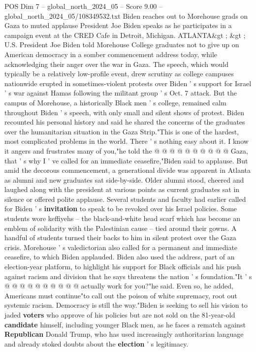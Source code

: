 \begin{textsample}{POS Dim 7 – global\_north\_2024\_05 – Score 9.00 – global\_north\_2024\_05/108349532.txt}  \label{ex:f7_pos_056}
Biden reaches out to Morehouse grads on Gaza to muted applause President Joe Biden speaks as he participates in a campaign event at the CRED Cafe in Detroit, Michigan.
ATLANTA\&gt ; \&gt ; U.S.
President Joe Biden told Morehouse College graduates not to give up on American democracy in a somber commencement address today, while acknowledging their anger over the war in Gaza.
The speech, which would typically be a relatively low-profile event, drew scrutiny as college campuses nationwide erupted in sometimes-violent protests over Biden ' s support for Israel ' s war against Hamas following the militant group ' s Oct. 7 attack.
But the campus of Morehouse, a historically Black men ' s college, remained calm throughout Biden ' s speech, with only small and silent shows of protest.
Biden recounted his personal history and said he shared the concerns of the graduates over the humanitarian situation in the Gaza Strip."This is one of the hardest, most complicated problems in the world.
There ' s nothing easy about it.
I know it angers and frustrates many of you,"he told the @ @ @ @ @ @ @ @ @ @ Gaza, that ' s why I ' ve called for an immediate ceasefire,"Biden said to applause.
But amid the decorous commencement, a generational divide was apparent in Atlanta as alumni and new graduates sat side-by-side.
Older alumni stood, cheered and laughed along with the president at various points as current graduates sat in silence or offered polite applause.
Several students and faculty had earlier called for Biden ' s \textbf{invitation} to speak to be revoked over his Israel policies.
Some students wore keffiyehs -- the black-and-white head scarf which has become an emblem of solidarity with the Palestinian cause -- tied around their gowns.
A handful of students turned their backs to him in silent protest over the Gaza crisis.
Morehouse ' s valedictorian also called for a permanent and immediate ceasefire, to which Biden applauded.
Biden also used the address, part of an election-year platform, to highlight his support for Black officials and his push against racism and division that he says threatens the nation ' s foundation."It ' s @ @ @ @ @ @ @ @ @ @ actually work for you?"he said.
Even so, he added, Americans must continue"to call out the poison of white supremacy, root out systemic racism.
Democracy is still the way."Biden is seeking to sell his vision to jaded \textbf{voters} who approve of his policies but are not sold on the 81-year-old \textbf{candidate} himself, including younger Black men, as he faces a rematch against \textbf{Republican} Donald Trump, who has used increasingly authoritarian language and already stoked doubts about the \textbf{election} ' s legitimacy.

\end{textsample}
